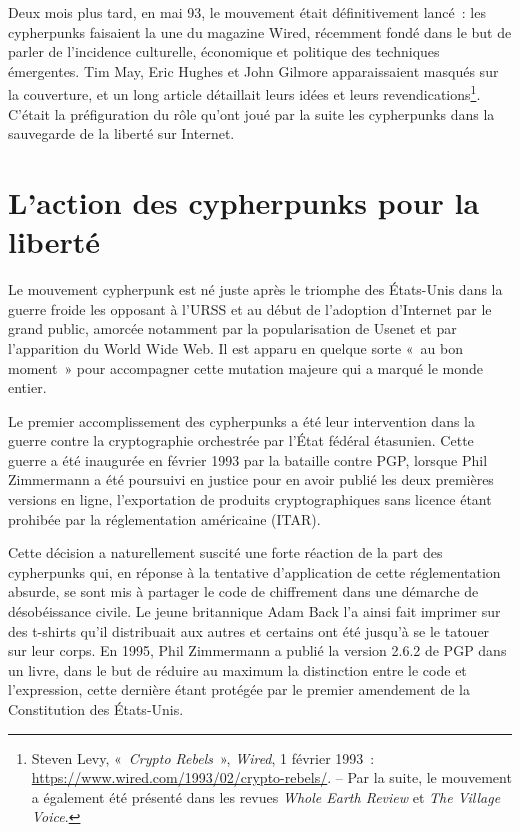 \documentclass[
  a5paper,
  smalldemyvopaper,10pt,twoside,onecolumn,openright,extrafontsizes,hidelinks]{memoir}
\begin{document}
Deux mois plus tard, en mai 93, le mouvement était définitivement
lancé~: les cypherpunks faisaient la une du magazine Wired, récemment
fondé dans le but de parler de l'incidence culturelle, économique et
politique des techniques émergentes. Tim May, Eric Hughes et John
Gilmore apparaissaient masqués sur la couverture, et un long article
détaillait leurs idées et leurs revendications\footnote{Steven Levy,
  «~\emph{Crypto Rebels}~», \emph{Wired}, 1 février 1993~:
  \url{https://www.wired.com/1993/02/crypto-rebels/}. -- Par la suite,
  le mouvement a également été présenté dans les revues \emph{Whole
  Earth Review} et \emph{The Village Voice}.}. C'était la préfiguration
du rôle qu'ont joué par la suite les cypherpunks dans la sauvegarde de
la liberté sur Internet.

\section*{L'action des cypherpunks pour la
liberté}\label{laction-des-cypherpunks-pour-la-libertuxe9}


Le mouvement cypherpunk est né juste après le triomphe des États-Unis
dans la guerre froide les opposant à l'URSS et au début de l'adoption
d'Internet par le grand public, amorcée notamment par la popularisation
de Usenet et par l'apparition du World Wide Web. Il est apparu en
quelque sorte «~au bon moment~» pour accompagner cette mutation majeure
qui a marqué le monde entier.

Le premier accomplissement des cypherpunks a été leur intervention dans
la guerre contre la cryptographie orchestrée par l'État fédéral
étasunien. Cette guerre a été inaugurée en février 1993 par la bataille
contre PGP, lorsque Phil Zimmermann a été poursuivi en justice pour en
avoir publié les deux premières versions en ligne, l'exportation de
produits cryptographiques sans licence étant prohibée par la
réglementation américaine (ITAR).

Cette décision a naturellement suscité une forte réaction de la part des
cypherpunks qui, en réponse à la tentative d'application de cette
réglementation absurde, se sont mis à partager le code de chiffrement
dans une démarche de désobéissance civile. Le jeune britannique Adam
Back l'a ainsi fait imprimer sur des t-shirts qu'il distribuait aux
autres et certains ont été jusqu'à se le tatouer sur leur corps. En
1995, Phil Zimmermann a publié la version 2.6.2 de PGP dans un livre,
dans le but de réduire au maximum la distinction entre le code et
l'expression, cette dernière étant protégée par le premier amendement de
la Constitution des États-Unis.
\end{document}
